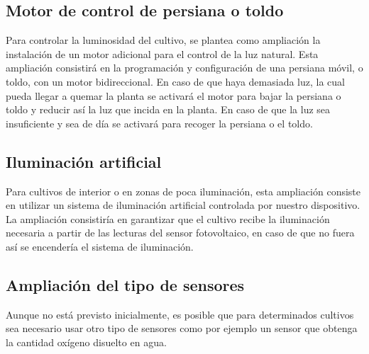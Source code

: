 \documentclass[12pt,a4paper,titlepage,oneside]{report}
\begin{document}
	\subsection*{Motor de control de persiana o toldo}
	Para controlar la luminosidad del cultivo, se plantea como ampliación la instalación de un motor adicional para el control de la luz natural. Esta ampliación consistirá en la programación y configuración de una persiana móvil, o toldo, con un motor bidireccional. En caso de que haya demasiada luz, la cual pueda llegar a quemar la planta se activará el motor para bajar la persiana o toldo y reducir así la luz que incida en la planta. En caso de que la luz sea insuficiente y sea de día se activará para recoger la persiana o el toldo.
	
	\subsection*{Iluminación artificial}
	Para cultivos de interior o en zonas de poca iluminación, esta ampliación consiste en utilizar un sistema de iluminación artificial controlada por nuestro dispositivo. La ampliación consistiría en garantizar que el cultivo recibe la iluminación necesaria a partir de las lecturas del sensor fotovoltaico, en caso de que no fuera así se encendería el sistema de iluminación.


	\subsection*{Ampliación del tipo de sensores}
	Aunque no está previsto inicialmente, es posible que para determinados cultivos sea necesario usar otro tipo de sensores como por ejemplo un sensor que obtenga la cantidad oxígeno disuelto en agua.


	
\newpage
{}


\end{document}
